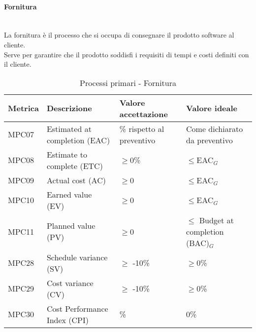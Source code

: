 \documentclass[10pt]{article}
\begin{document}
\begin{justify}
\paragraph{Fornitura}\mbox{}\\
La fornitura è il processo che si occupa di consegnare il prodotto software al cliente.\\
Serve per garantire che il prodotto soddisfi i requisiti di tempi e costi definiti con il cliente.\\
\begin{table}[H]
  \centering
\begin{tabular}{|p{1.5cm}|p{5cm}|p{4cm}|p{5cm}|}
  \hline
  \textbf{Metrica} & \textbf{Descrizione} & \textbf{Valore accettazione} & \textbf{Valore ideale}\\
  \hline
  MPC07 & Estimated at completion (EAC) & \textpm5\% rispetto al preventivo & Come dichiarato da preventivo\\
  \hline
  MPC08 & Estimate to complete (ETC) & $\geq$0\% & $\leq$EAC\(_G\) \\
  \hline
  MPC09 & Actual cost (AC) & $\geq$0 & $\leq$EAC\(_G\) \\
  \hline
  MPC10 & Earned value (EV) & $\geq$0 & $\leq$EAC\(_G\) \\
  \hline
  MPC11 & Planned value (PV) & $\geq$0 & $\leq$ Budget at completion (BAC)\(_G\) \\
  \hline
  MPC28 & Schedule variance (SV) & $\geq$ -10\% & $\geq$0\% \\
  \hline
  MPC29 & Cost variance (CV) & $\geq$ -10\% & $\geq$0\% \\
  \hline
  MPC30 & Cost Performance Index (CPI) & \textpm10\% & 0\% \\
  \hline
\end{tabular}
\caption{Processi primari - Fornitura}
\label{tab:fornitura}
\end{table}

\newpage




\end{justify}
\end{document}
